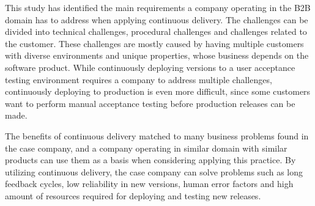 \documentclass[lnbip]{svmultln}
\begin{document}
This study has identified the main requirements a company operating in the B2B domain has to address when applying continuous delivery. The challenges can be divided into technical challenges, procedural challenges and challenges related to the customer. These challenges are mostly caused by having multiple customers with diverse environments and unique properties, whose business depends on the software product. While continuously deploying versions to a user acceptance testing environment requires a company to address multiple challenges, continuously deploying to production is even more difficult, since some customers want to perform manual acceptance testing before production releases can be made. 

The benefits of continuous delivery matched to many business problems found in the case company, and a company operating in similar domain with similar products can use them as a basis when considering applying this practice. By utilizing continuous delivery, the case company can solve problems such as long feedback cycles, low reliability in new versions, human error factors and high amount of resources required for deploying and testing new releases. 


\end{document}
